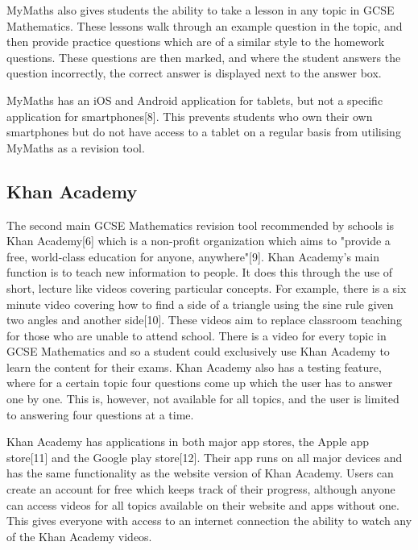 \documentclass{article}
\begin{document}
MyMaths also gives students the ability to take a lesson in any topic in GCSE Mathematics. These lessons walk through an example question in the topic, and then provide practice questions which are of a similar style to the homework questions. These questions are then marked, and where the student answers the question incorrectly, the correct answer is displayed next to the answer box. \par

MyMaths has an iOS and Android application for tablets, but not a specific application for smartphones[8]. This prevents students who own their own smartphones but do not have access to a tablet on a regular basis from utilising MyMaths as a revision tool. \par

\subsection{Khan Academy}

The second main GCSE Mathematics revision tool recommended by schools is Khan Academy[6] which is a non-profit organization which aims to "provide a free, world-class education for anyone, anywhere"[9]. Khan Academy's main function is to teach new information to people. It does this through the use of short, lecture like videos covering particular concepts. For example, there is a six minute video covering how to find a side of a triangle using the sine rule given two angles and another side[10]. These videos aim to replace classroom teaching for those who are unable to attend school. There is a video for every topic in GCSE Mathematics and so a student could exclusively use Khan Academy to learn the content for their exams. Khan Academy also has a testing feature, where for a certain topic four questions come up which the user has to answer one by one. This is, however, not available for all topics, and the user is limited to answering four questions at a time. \par

Khan Academy has applications in both major app stores, the Apple app store[11] and the Google play store[12]. Their app runs on all major devices and has the same functionality as the website version of Khan Academy. Users can create an account for free which keeps track of their progress, although anyone can access videos for all topics available on their website and apps without one. This gives everyone with access to an internet connection the ability to watch any of the Khan Academy videos. \par
\end{document}

